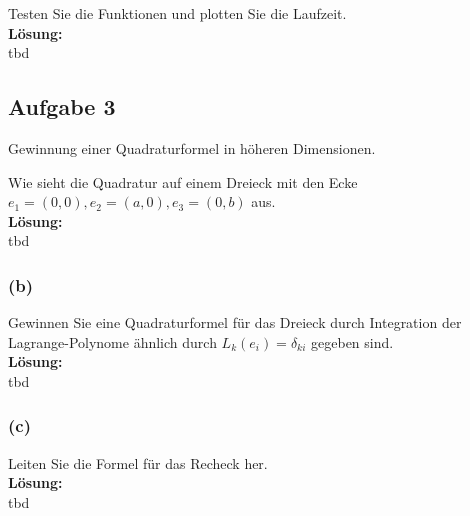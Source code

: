 \documentclass[11pt,a4paper,ngerman]{article}
\begin{document}

Testen Sie die Funktionen und plotten Sie die Laufzeit.\\

\textbf{Lösung:}\\

tbd

\subsection*{Aufgabe 3}

Gewinnung einer Quadraturformel in höheren Dimensionen.


Wie sieht die Quadratur auf einem Dreieck mit den Ecke $e_1 = (0,0), e_2 = (a,0), e_3 = (0,b)$ aus.\\

\textbf{Lösung:}\\

tbd

\subsubsection*{(b)}

Gewinnen Sie eine Quadraturformel für das Dreieck durch Integration der Lagrange-Polynome ähnlich
durch $L_k(e_i) = \delta_{ki}$ gegeben sind.\\

\textbf{Lösung:}\\

tbd

\subsubsection*{(c)}

Leiten Sie die Formel für das Recheck her.\\

\textbf{Lösung:}\\

tbd


\label{LastPage}
\end{document}
